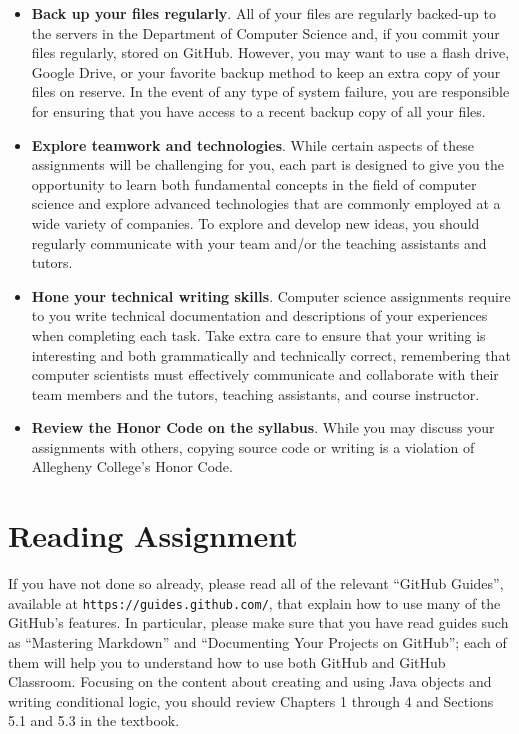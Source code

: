 \documentclass[11pt]{article}
\newcommand{\url}[1]{\lstinline{#1}}
\begin{document}
\begin{itemize}
\item {\bf Back up your files regularly}. All of your files are regularly backed-up to the servers in the Department of
  Computer Science and, if you commit your files regularly, stored on GitHub. However, you may want to use a flash
  drive, Google Drive, or your favorite backup method to keep an extra copy of your files on reserve. In the event of
  any type of system failure, you are responsible for ensuring that you have access to a recent backup copy of all your
  files.

\item {\bf Explore teamwork and technologies}. While certain aspects of these assignments will be challenging for you,
  each part is designed to give you the opportunity to learn both fundamental concepts in the field of computer science
  and explore advanced technologies that are commonly employed at a wide variety of companies. To explore and develop
  new ideas, you should regularly communicate with your team and/or the teaching assistants and tutors.

\item {\bf Hone your technical writing skills}. Computer science assignments require to you write technical
  documentation and descriptions of your experiences when completing each task. Take extra care to ensure that your
  writing is interesting and both grammatically and technically correct, remembering that computer scientists must
  effectively communicate and collaborate with their team members and the tutors, teaching assistants, and course
  instructor.

\item {\bf Review the Honor Code on the syllabus}. While you may discuss your assignments with others, copying source
  code or writing is a violation of Allegheny College's Honor Code.

\end{itemize}

\section*{Reading Assignment}

If you have not done so already, please read all of the relevant ``GitHub Guides'', available at
\url{https://guides.github.com/}, that explain how to use many of the GitHub's features. In particular, please make sure
that you have read guides such as ``Mastering Markdown'' and ``Documenting Your Projects on GitHub''; each of them will
help you to understand how to use both GitHub and GitHub Classroom. Focusing on the content about creating and using
Java objects and writing conditional logic, you should review Chapters 1 through 4 and Sections 5.1 and 5.3 in the
textbook.
\end{document}
